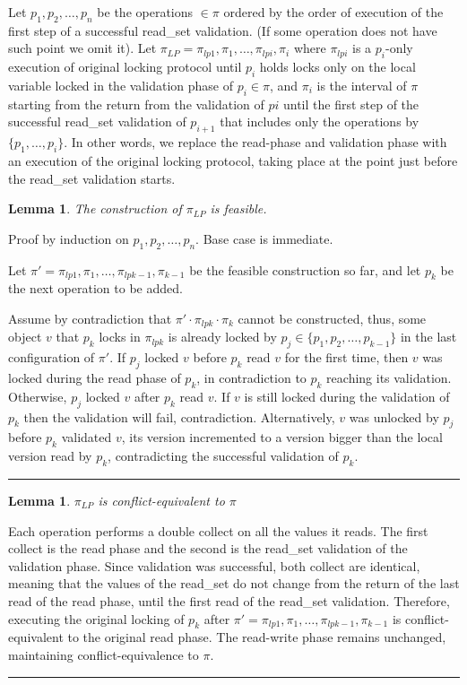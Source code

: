 \documentclass{article}
\newtheorem{lemma}[theorem]{Lemma}
\newenvironment{proof}[1][Proof]{\begin{trivlist}
\item[\hskip \labelsep {\bfseries #1}]}{\qedsymb\end{trivlist}}
\newcommand{\qedsymb}{\hfill{\rule{2mm}{2mm}}}
\newcommand{\code}[1]{\textsf{#1}}
\newcommand{\readSet}{\code{read\_set}\xspace}
\begin{document}
Let $p_1,p_2,\ldots,p_n$ be the operations $\in\pi$ ordered by the 
order of execution of the first step of a successful \readSet 
validation. (If some operation does not have such point we omit it).
Let $\pi_{LP} = \pi_{lp1},\pi_{1},\ldots,\pi_{lpi},\pi_{i}$ where 
$\pi_{lpi}$ is a $p_i$-only execution of original locking protocol 
until $p_i$ holds locks only on the local variable locked
in the validation phase of $p_i \in \pi$, and $\pi_i$ is
the interval of $\pi$ starting from the return from the validation of
$pi$ until the first step of the successful \readSet validation of 
$p_{i+1}$ that includes only the operations by $\{p_1,\ldots,p_i\}$.
In other words, we replace the read-phase and validation phase with 
an execution of the original locking protocol, 
taking place at the point just before the \readSet validation starts. 

\begin{lemma}
The construction of $\pi_{LP}$ is feasible.  
\end{lemma}
\begin{proof}
Proof by induction on $p_1,p_2,\ldots,p_n$. Base case is immediate. 

Let $\pi' = \pi_{lp1},\pi_{1},\ldots,\pi_{lpk-1},\pi_{k-1}$ be the feasible
construction so far, and let $p_{k}$ be the next operation to be 
added. 

Assume by contradiction that $\pi'\cdot\pi_{lpk}\cdot\pi_{k}$ 
cannot be constructed, thus, some object $v$ that $p_{k}$ locks 
in $\pi_{lpk}$ is already locked 
by $p_j \in \{p_1,p_2,\ldots,p_{k-1}\}$ in
the last configuration of $\pi'$. 
If $p_j$ locked $v$ before $p_k$ read $v$ for the first time, 
then $v$ was locked during the read phase of $p_k$, 
in contradiction to $p_k$ reaching its validation. 
Otherwise, $p_j$ locked $v$ after $p_k$ read $v$. 
If $v$ is still locked during the validation of $p_k$ then 
the validation will fail, contradiction. Alternatively, $v$ 
was unlocked by $p_j$ before $p_k$ validated $v$, 
its version incremented to a version bigger 
than the local version read by $p_k$, 
contradicting the successful validation of $p_k$.  
\end{proof}

\begin{lemma}
$\pi_{LP}$ is conflict-equivalent to $\pi$
\end{lemma}
\begin{proof}
Each operation performs a double collect on all the values it reads. 
The first collect is the read phase and the second is the \readSet 
validation of the validation phase. Since validation was successful, 
both collect are identical, meaning that the values of the \readSet
do not change from the return of the last read of the read phase,
until the first read of the \readSet validation. Therefore, executing 
the original locking of $p_k$ after $\pi' =
\pi_{lp1},\pi_{1},\ldots,\pi_{lpk-1},\pi_{k-1}$ is conflict-equivalent
to the original read phase. The read-write phase remains unchanged, 
maintaining conflict-equivalence to $\pi$.
\end{proof}




\end{document}
